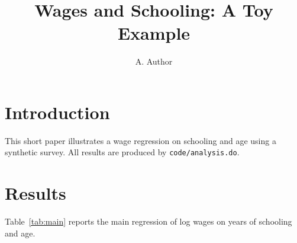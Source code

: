 \documentclass{article}
\title{Wages and Schooling: A Toy Example}
\author{A. Author}
\begin{document}
\maketitle

\section{Introduction}

This short paper illustrates a wage regression on schooling and age using
a synthetic survey. All results are produced by \texttt{code/analysis.do}.

\section{Results}

Table~\ref{tab:main} reports the main regression of log wages on years of
schooling and age.

\begin{table}[h]
\centering

\caption{Wage regression}
\label{tab:main}
\end{table}
\end{document}
